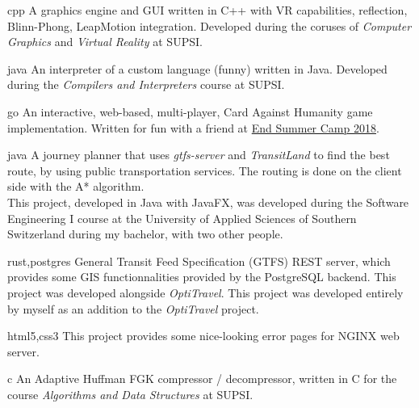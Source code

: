 \begin{CV}
    {}
    {cpp}
    {A graphics engine and GUI written in C++ with VR capabilities, reflection, Blinn-Phong, LeapMotion integration.
    Developed during the coruses of \textit{Computer Graphics} and \textit{Virtual Reality} at SUPSI.}
    

    {}
    {java}
    {An interpreter of a custom language (funny) written in Java. Developed during the 
    \textit{Compilers and Interpreters} course at SUPSI.}
    
    {}
    {go}
    {An interactive, web-based, multi-player, Card Against Humanity game implementation. Written for fun with
    a friend at \href{https://www.endsummercamp.org}{End Summer Camp 2018}.}
    

    {}
    {java}
    {A journey planner that uses \textit{gtfs-server} and \textit{TransitLand} to find the best route, by using
    public transportation services. The routing is done on the client side with the A* algorithm.\\
    This project, developed in Java with JavaFX, was developed during the Software Engineering I course
    at the University of Applied Sciences of Southern Switzerland during my bachelor,
    with two other people.}

    
    {}
    {rust,postgres}
    {General Transit Feed Specification (GTFS) REST server, which provides some GIS functionnalities provided
    by the PostgreSQL backend. This project was developed alongside \textit{OptiTravel}.
    This project was developed entirely by myself as an addition to the \textit{OptiTravel} project.}


    {}
    {html5,css3}
    {This project provides some nice-looking error pages for NGINX web server.}
    
    {}
    {c}
    {An Adaptive Huffman FGK compressor / decompressor, written in C for the course 
    \textit{Algorithms and Data Structures} at SUPSI.}


\end{CV}
